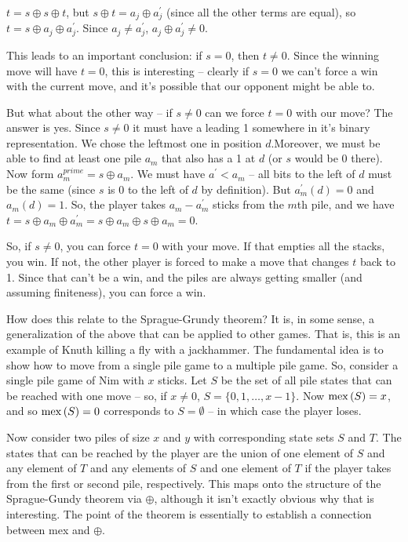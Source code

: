 $t = s \oplus s \oplus t$, but $s \oplus t = a_j \oplus a^{\prime}_j$
(since all the other terms are equal), so
$t = s \oplus a_j \oplus a^{\prime}_j$.  Since $a_j \ne a^{\prime}_j$,
$a_j \oplus a^{\prime}_j \ne 0$.

This leads to an important conclusion: if $s = 0$, then $t \ne 0$.
Since the winning move will have $t = 0$, this is interesting -- 
clearly if $s=0$ we can't force a win with the current move, and it's
possible that our opponent might be able to.  

But what about the other way -- if $s \ne 0$ can we force $t = 0$ with our 
move?  The answer is yes.  Since $s \ne 0$ it must have a leading 1
somewhere in it's binary representation.  We chose the leftmost one in
position $d$.Moreover, we must be able to
find at least one pile $a_m$ that also has a 1 at $d$ (or $s$
would be 0 there).  Now form $a^{prime}_m = s \oplus a_m$.  We must
have $a^{\prime} < a_m$ -- all bits to the left of $d$ must
be the same (since $s$ is 0 to the left of $d$ by definition).
But $a^{\prime}_m \left(d \right) = 0$ and $a_m\left(d\right) = 1$.
So, the player takes $a_m - a^{\prime}_m$ sticks from the $m$th pile,
and we have $t = s \oplus a_m \oplus a^{\prime}_m = s \oplus a_m 
\oplus s \oplus a_m = 0$.

So, if $s \ne 0$, you can force $t = 0$ with your move.  If that 
empties all the stacks, you win.  If not, the other player is forced
to make a move that changes $t$ back to 1.  Since that can't be a win,
and the piles are always getting smaller (and assuming finiteness),
you can force a win.

How does this relate to the Sprague-Grundy theorem?  It is, in some
sense, a generalization of the above that can be applied to other games.
That is, this is an example of Knuth killing a fly with a jackhammer.
The fundamental idea is to show how to move from a single pile game
to a multiple pile game. So, consider a single pile game of Nim with
$x$ sticks.  Let $S$ be the set of all pile states that can be reached
with one move -- so, if $x \ne 0$, $S = \{0, 1, \ldots, x-1\}$.
Now ${\rm mex}\left(S\right) = x$, and so ${\rm mex}\left(S\right) = 0$
corresponds to $S = \emptyset$ -- in which case the player loses.

Now consider two piles of size $x$ and $y$ with corresponding state
sets $S$ and $T$.  The states that can be reached by the player are 
the union of one element of $S$ and any element of $T$ and 
any elements of $S$ and one element of $T$ if the player takes from
the first or second pile, respectively.  This maps onto the structure
of the Sprague-Gundy theorem via $\oplus$, although it isn't exactly
obvious why that is interesting.  The point of the theorem is essentially
to establish a connection between mex and $\oplus$.

